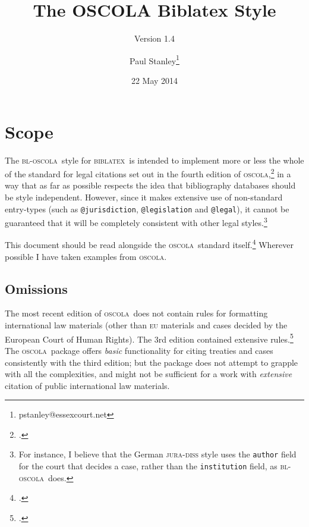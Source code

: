 \documentclass[a4paper,
               11pt,
	       DIV=1,			   
	       footinclude=false]
	      {scrartcl}
\def\releasedate{22 May 2014}
\def\versionnumber{1.4}
\newcommand{\oscola}{\textsc{bl-oscola}}
\newcommand{\biblatex}{\textsc{biblatex}}
\newcommand{\oscolashort}{\textsc{oscola}\nocite{oscola}}
\begin{document}
\title{The OSCOLA Biblatex Style}
\subtitle{Version \versionnumber}

\author{Paul Stanley\thanks{pstanley@essexcourt.net}}

\date{\releasedate}

\maketitle

\tableofcontents

\section{Scope}

The \oscola\ style for \biblatex\
is intended to implement more or less the whole of the standard for
legal citations set out in the fourth edition of
\oscolashort,\footcite{oscola} in a way that as far as possible
respects the idea that bibliography databases should be style
independent. However, since it
makes extensive use of non-standard entry-types (such as
\texttt{@jurisdiction}, \texttt{@legislation} and \texttt{@legal}), it
cannot be guaranteed that it will be completely consistent with other
legal styles.\footnote{For instance, I believe that the German
  \textsc{jura-diss} style uses the \texttt{author} field for the
  court that decides a case, rather than the \texttt{institution}
  field, as \oscola\ does.}

This document should be read alongside the \oscolashort\ standard
itself.\footcite{oscola} Wherever possible I have taken examples from
\oscolashort.

\subsection{Omissions\label{scope}}

 The most
recent edition of \oscolashort\ does not contain rules for formatting
international law materials (other than \textsc{eu} materials and
cases decided by the European Court of Human Rights). The 3rd edition
contained extensive rules.\footcite[25--37]{oscola3} The \oscolashort\
package offers \emph{basic} functionality for citing treaties and cases
consistently with the third edition; but the package does not attempt
to grapple with all the complexities, and might not be sufficient for
a work with \emph{extensive} citation of public international law
materials.
\end{document}
